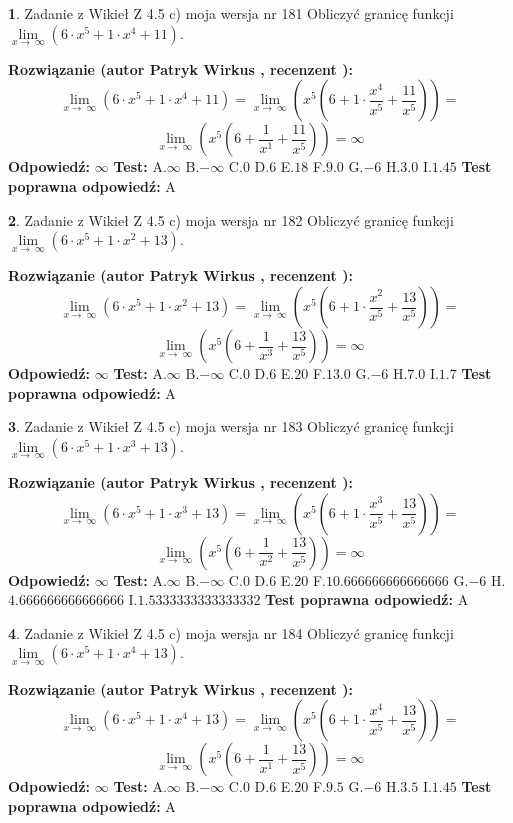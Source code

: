 \documentclass[12pt, a4paper]{article}
\theoremstyle{definition} %
\newtheorem{zad}{}
\newcommand{\zadStart}[1]{\begin{zad}#1\newline}
\newcommand{\zadStop}{\end{zad}}
\newcommand{\rozwStart}[2]{\noindent \textbf{Rozwiązanie (autor #1 , recenzent #2): }\newline}
\newcommand{\rozwStop}{\newline}
\newcommand{\odpStart}{\noindent \textbf{Odpowiedź:}\newline}
\newcommand{\odpStop}{\newline}
\newcommand{\testStart}{\noindent \textbf{Test:}\newline}
\newcommand{\testStop}{\newline}
\newcommand{\kluczStart}{\noindent \textbf{Test poprawna odpowiedź:}\newline}
\newcommand{\kluczStop}{\newline}
\begin{document}
\zadStart{Zadanie z Wikieł Z 4.5 c) moja wersja nr 181}
Obliczyć granicę funkcji  $\lim\limits_{x\to\ \infty}(6 \cdot x^{5}+1 \cdot x^{4}+11)$.
\zadStop
\rozwStart{Patryk Wirkus}{}
$$\lim\limits_{x\to\ \infty}(6 \cdot x^{5}+1 \cdot x^{4}+11) = \lim\limits_{x\to\ \infty}(x^{5}(6 +1 \cdot \frac{x^{4}}{x^{5}}+\frac{11}{x^{5}})) =$$ $$\lim\limits_{x\to\ \infty}(x^{5}(6 +\frac{1}{x^{1}}+\frac{11}{x^{5}})) =\infty$$
\rozwStop
\odpStart
$\infty$
\odpStop
\testStart
A.$\infty$ B.$-\infty$ C.$0$ D.$6$ E.$18$
F.$9.0$ G.$-6$
H.$3.0$
I.$1.45$
\testStop
\kluczStart
A
\kluczStop



\zadStart{Zadanie z Wikieł Z 4.5 c) moja wersja nr 182}
Obliczyć granicę funkcji  $\lim\limits_{x\to\ \infty}(6 \cdot x^{5}+1 \cdot x^{2}+13)$.
\zadStop
\rozwStart{Patryk Wirkus}{}
$$\lim\limits_{x\to\ \infty}(6 \cdot x^{5}+1 \cdot x^{2}+13) = \lim\limits_{x\to\ \infty}(x^{5}(6 +1 \cdot \frac{x^{2}}{x^{5}}+\frac{13}{x^{5}})) =$$ $$\lim\limits_{x\to\ \infty}(x^{5}(6 +\frac{1}{x^{3}}+\frac{13}{x^{5}})) =\infty$$
\rozwStop
\odpStart
$\infty$
\odpStop
\testStart
A.$\infty$ B.$-\infty$ C.$0$ D.$6$ E.$20$
F.$13.0$ G.$-6$
H.$7.0$
I.$1.7$
\testStop
\kluczStart
A
\kluczStop



\zadStart{Zadanie z Wikieł Z 4.5 c) moja wersja nr 183}
Obliczyć granicę funkcji  $\lim\limits_{x\to\ \infty}(6 \cdot x^{5}+1 \cdot x^{3}+13)$.
\zadStop
\rozwStart{Patryk Wirkus}{}
$$\lim\limits_{x\to\ \infty}(6 \cdot x^{5}+1 \cdot x^{3}+13) = \lim\limits_{x\to\ \infty}(x^{5}(6 +1 \cdot \frac{x^{3}}{x^{5}}+\frac{13}{x^{5}})) =$$ $$\lim\limits_{x\to\ \infty}(x^{5}(6 +\frac{1}{x^{2}}+\frac{13}{x^{5}})) =\infty$$
\rozwStop
\odpStart
$\infty$
\odpStop
\testStart
A.$\infty$ B.$-\infty$ C.$0$ D.$6$ E.$20$
F.$10.666666666666666$ G.$-6$
H.$4.666666666666666$
I.$1.5333333333333332$
\testStop
\kluczStart
A
\kluczStop



\zadStart{Zadanie z Wikieł Z 4.5 c) moja wersja nr 184}
Obliczyć granicę funkcji  $\lim\limits_{x\to\ \infty}(6 \cdot x^{5}+1 \cdot x^{4}+13)$.
\zadStop
\rozwStart{Patryk Wirkus}{}
$$\lim\limits_{x\to\ \infty}(6 \cdot x^{5}+1 \cdot x^{4}+13) = \lim\limits_{x\to\ \infty}(x^{5}(6 +1 \cdot \frac{x^{4}}{x^{5}}+\frac{13}{x^{5}})) =$$ $$\lim\limits_{x\to\ \infty}(x^{5}(6 +\frac{1}{x^{1}}+\frac{13}{x^{5}})) =\infty$$
\rozwStop
\odpStart
$\infty$
\odpStop
\testStart
A.$\infty$ B.$-\infty$ C.$0$ D.$6$ E.$20$
F.$9.5$ G.$-6$
H.$3.5$
I.$1.45$
\testStop
\kluczStart
A
\kluczStop
\end{document}
